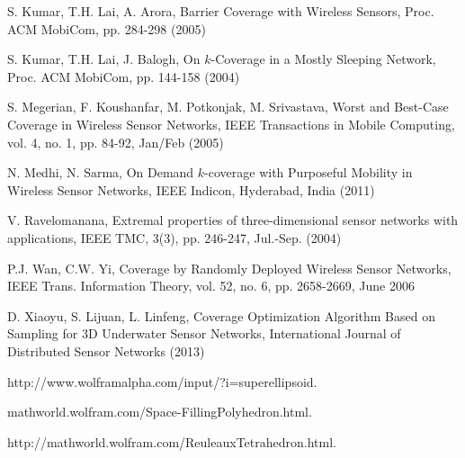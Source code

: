 \documentclass[conference]{IEEEtran}
\begin{document}
\begin{thebibliography}{99}

S. Kumar, T.H. Lai, A. Arora, Barrier Coverage with Wireless Sensors, Proc. ACM MobiCom, pp. 284-298 (2005)


S. Kumar, T.H. Lai, J. Balogh, On $k$-Coverage in a Mostly Sleeping Network, Proc. ACM MobiCom, pp. 144-158 (2004)


S. Megerian, F. Koushanfar, M. Potkonjak, M. Srivastava, Worst and Best-Case Coverage in Wireless Sensor Networks, IEEE Transactions in Mobile Computing, vol. 4, no. 1, pp. 84-92, Jan/Feb (2005)


N. Medhi, N. Sarma, On Demand $k$-coverage with Purposeful Mobility in Wireless Sensor Networks, IEEE Indicon, Hyderabad, India (2011)


V. Ravelomanana, Extremal properties of three-dimensional sensor networks with applications, IEEE TMC, 3(3), pp. 246-247, Jul.-Sep. (2004)


P.J. Wan, C.W. Yi, Coverage by Randomly Deployed Wireless Sensor Networks, IEEE Trans. Information Theory, vol. 52, no. 6, pp. 2658-2669, June 2006


D. Xiaoyu, S. Lijuan, L. Linfeng, Coverage Optimization Algorithm Based on Sampling for 3D Underwater Sensor Networks, International Journal of Distributed Sensor Networks (2013)

http://www.wolframalpha.com/input/?i=superellipsoid.

mathworld.wolfram.com/Space-FillingPolyhedron.html.

http://mathworld.wolfram.com/ReuleauxTetrahedron.html.


\end{thebibliography}
\end{document}
